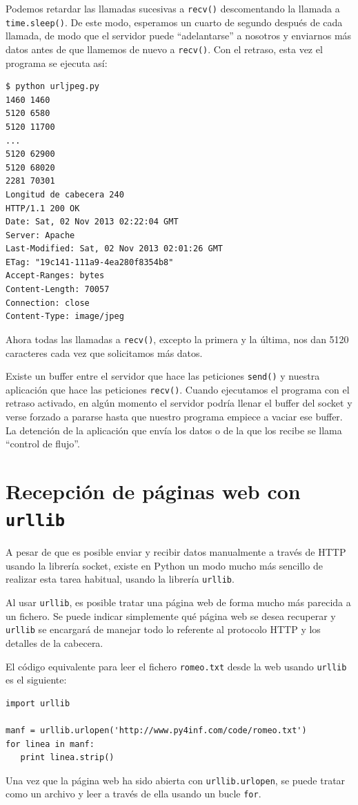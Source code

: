 Podemos retardar las llamadas sucesivas a {\tt recv()} descomentando la llamada
a {\tt time.sleep()}. De este modo, esperamos un cuarto de segundo después de cada llamada,
de modo que el servidor puede ``adelantarse'' a nosotros y enviarnos más datos
antes de que llamemos de nuevo a {\tt recv()}. Con el retraso, esta vez el programa
se ejecuta así:
\beforeverb
\begin{verbatim}
$ python urljpeg.py 
1460 1460
5120 6580
5120 11700
...
5120 62900
5120 68020
2281 70301
Longitud de cabecera 240
HTTP/1.1 200 OK
Date: Sat, 02 Nov 2013 02:22:04 GMT
Server: Apache
Last-Modified: Sat, 02 Nov 2013 02:01:26 GMT
ETag: "19c141-111a9-4ea280f8354b8"
Accept-Ranges: bytes
Content-Length: 70057
Connection: close
Content-Type: image/jpeg
\end{verbatim}
\afterverb
%
Ahora todas las llamadas a {\tt recv()}, excepto la primera y la última,
nos dan 5120 caracteres cada vez que solicitamos más datos.

Existe un buffer entre el servidor que hace las peticiones {\tt send()}
y nuestra aplicación que hace las peticiones {\tt recv()}. Cuando ejecutamos
el programa con el retraso activado, en algún momento el servidor podría
llenar el buffer del socket y verse forzado a pararse hasta que
nuestro programa empiece a vaciar ese buffer. La detención de la aplicación
que envía los datos o de la que los recibe se llama
``control de flujo''.

\section{Recepción de páginas web con {\tt urllib}}

A pesar de que es posible enviar y recibir datos manualmente a través de HTTP
usando la librería socket, existe en Python un modo mucho más sencillo de
realizar esta tarea habitual,
usando la librería {\tt urllib}.

Al usar {\tt urllib},
es posible tratar una página web de forma mucho más parecida a un fichero. Se puede
indicar simplemente qué página web se desea recuperar y
{\tt urllib} se encargará de manejar todo lo referente al protocolo HTTP y
los detalles de la cabecera.

El código equivalente para leer el fichero {\tt romeo.txt}
desde la web usando {\tt urllib} es el siguiente:

\beforeverb
\begin{verbatim}
import urllib

manf = urllib.urlopen('http://www.py4inf.com/code/romeo.txt')
for linea in manf:
   print linea.strip()
\end{verbatim}
\afterverb
%
Una vez que la página web ha sido abierta con
{\tt urllib.urlopen}, se puede tratar como
un archivo y leer a través de ella usando un
bucle {\tt for}.

